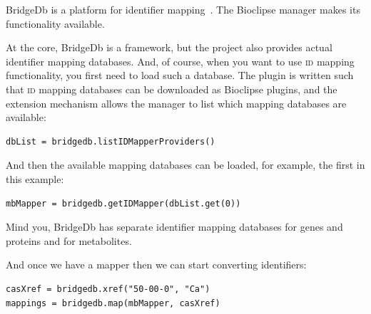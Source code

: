 \documentclass{book}
\begin{document}
\begin{refsection}
BridgeDb is a platform for identifier mapping~\cite{van2010bridgedb}. The
Bioclipse manager makes its functionality available.

At the core, BridgeDb is a framework, but the project
also provides actual identifier mapping databases. And, of course, when you
want to use \textsc{id} mapping functionality, you first need to load such a database.
The plugin is written such that \textsc{id} mapping databases can be downloaded as
Bioclipse plugins, and the extension mechanism allows the manager to list
which mapping databases are available:

\begin{Verbatim}
dbList = bridgedb.listIDMapperProviders()
\end{Verbatim}

And then the available mapping databases can be loaded, for example,
the first in this example:

\begin{Verbatim}
mbMapper = bridgedb.getIDMapper(dbList.get(0))
\end{Verbatim}

Mind you, BridgeDb has separate identifier mapping databases for genes and
proteins and for metabolites.

And once we have a mapper then we can start converting identifiers:

\begin{Verbatim}
casXref = bridgedb.xref("50-00-0", "Ca")
mappings = bridgedb.map(mbMapper, casXref)
\end{Verbatim}

\printbibliography[heading=subbibliography]
\end{refsection}
\end{document}
